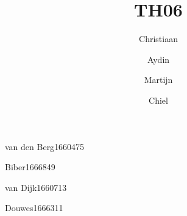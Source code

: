 \title{TH06}

\author{Christiaan}{van den Berg}{1660475}
\author{Aydin}{Biber}{1666849}
\author{Martijn}{van Dijk}{1660713}
\author{Chiel}{Douwes}{1666311}

